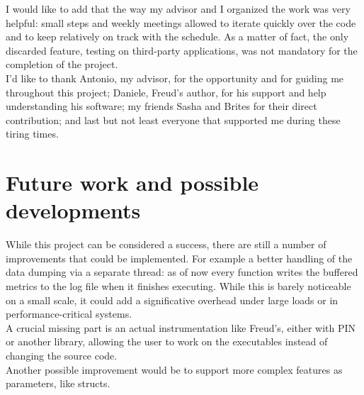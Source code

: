     I would like to add that the way my advisor and I organized the work was very helpful: small
    steps and weekly meetings allowed to iterate quickly over the code and to keep 
    relatively on track with the schedule. As a matter of fact, the only discarded feature,
    testing on third-party applications, was not mandatory for the completion of the project.\\

    I'd like to thank Antonio, my advisor, for the opportunity and for guiding me throughout
    this project; Daniele, Freud's author, for his support and help
    understanding his software; my friends Sasha and Brites for their direct contribution;
    and last but not least everyone that supported me during these tiring times.


	\section{Future work and possible developments}

        While this project can be considered a success, there are still a number of improvements
        that could be implemented. For example a better handling of the data dumping via a separate thread:
        as of now every function writes the buffered metrics to the log file when it finishes executing. While this
        is barely noticeable on a small scale, it could add a significative overhead under large loads
        or in performance-critical systems.\\

        A crucial missing part is an actual instrumentation like Freud's, either with PIN or another
        library, allowing the user to work on the executables instead of changing the source code.\\

        Another possible improvement would be to support more complex features as parameters, like structs.
